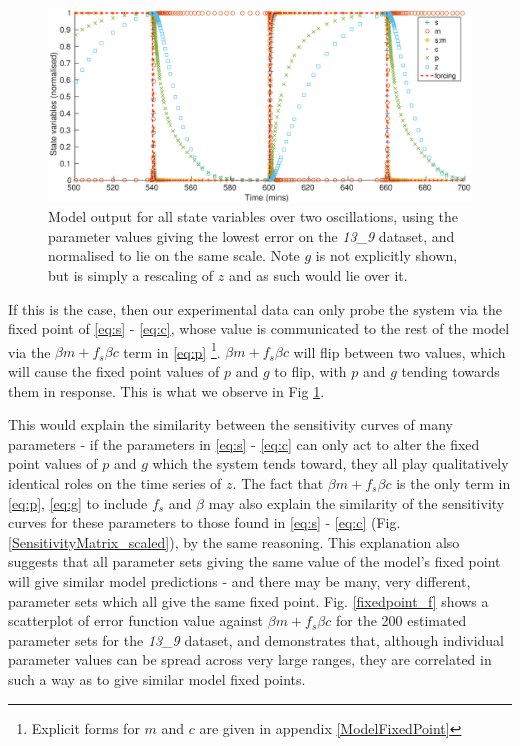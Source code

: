 \documentclass[10pt,journal]{./IEEE_latex_class/IEEEtran}
\begin{document}
\begin{figure}[h]	
    \centering
        \includegraphics[scale = 0.25,clip = true, trim = 95 0 60 0]{model_output}
        \caption{Model output for all state variables over two oscillations, using the parameter values giving the lowest error on the \textit{13\_9} dataset, and normalised to lie on the same scale. Note $g$ is not explicitly shown, but is simply a rescaling of $z$ and as such would lie over it. }
        \label{model_output} 
\end{figure}

If this is the case, then our experimental data can only probe the system via the fixed point of \eqref{eq:s} - \eqref{eq:c}, whose value is communicated to the rest of the model via the $\beta m +f_{s}\beta c$ term in \eqref{eq:p} \footnote{ Explicit forms for $m$ and $c$ are given in appendix \ref{ModelFixedPoint}}. $\beta m +f_{s}\beta c$ will flip between two values, which will cause the fixed point values of $p$ and $g$ to flip, with $p$ and $g$ tending towards them in response. This is what we observe in Fig \ref{model_output}.

This would explain the similarity between the sensitivity curves of many parameters - if the parameters in \eqref{eq:s} - \eqref{eq:c} can only act to alter the fixed point values of $p$ and $g$ which the system tends toward, they all play qualitatively identical roles on the time series of $z$. The fact that $\beta m +f_{s}\beta c$ is the only term in \eqref{eq:p}, \eqref{eq:g} to include $f_{s}$ and $\beta$ may also explain the similarity of the sensitivity curves for these parameters to those found in \eqref{eq:s} - \eqref{eq:c} (Fig. \ref{SensitivityMatrix_scaled}), by the same reasoning. This explanation also suggests that all parameter sets giving the same value of the model's fixed point will give similar model predictions - and there may be many, very different, parameter sets which all give the same fixed point. Fig. \ref{fixedpoint_f} shows a scatterplot of error function value against $\beta m +f_{s}\beta c$ for the 200 estimated parameter sets for the \textit{13\_9} dataset, and demonstrates that, although individual parameter values can be spread across very large ranges, they are correlated in such a way as to give similar model fixed points. 
\end{document}
